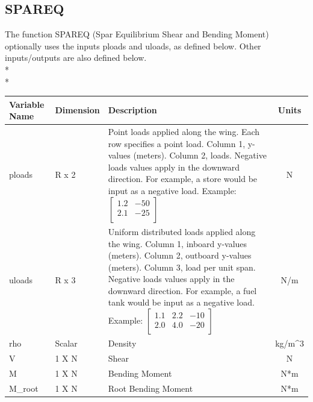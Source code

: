 \documentclass{article}
\begin{document}
\subsection{SPAREQ}
The function SPAREQ (Spar Equilibrium Shear and Bending Moment)
optionally uses the inputs ploads and uloads, as defined below.  Other
inputs/outputs are also defined below.\\*\\*
\begin{tabular}{|l|l|p{2.5in}|c|}
  \hline
  \textbf{Variable Name} &
  \textbf{Dimension} &
  \textbf{Description} &
  \textbf{Units}
  \\
  \hline
  ploads & R x 2 &
  Point loads applied along the wing.  Each row specifies a point
  load.  Column 1, y-values (meters).  Column 2, loads.  Negative
  loads values apply in the downward direction.  For example, a store
  would be input as a negative load.  Example:
  $\begin{bmatrix}1.2&-50\\2.1&-25\\\end{bmatrix}$ &
  N
  \\
  \hline
  uloads & R x 3 &
  Uniform distributed loads applied along the wing.  Column 1, inboard
  y-values (meters).  Column 2, outboard y-values (meters).  Column 3,
  load per unit span.  Negative loads values apply in the downward
  direction.  For example, a fuel tank would be input as a negative
  load.  Example:
  $\begin{bmatrix}1.1&2.2&-10\\2.0&4.0&-20\\\end{bmatrix}$ &
  N/m
  \\
  \hline
  rho & Scalar &
  Density &
  kg/m\^{}3
  \\
  \hline
  V & 1 X N &
  Shear &
  N
  \\
  \hline
  M & 1 X N &
  Bending Moment &
  N*m
  \\
  \hline
  M\_root & 1 X N &
  Root Bending Moment &
  N*m
  \\
  \hline
\end{tabular}
\end{document}

